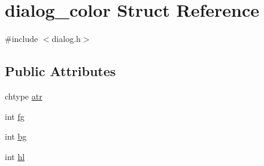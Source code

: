 \hypertarget{structdialog__color}{\section{dialog\-\_\-color Struct Reference}
\label{structdialog__color}
}


{\ttfamily \#include $<$dialog.\-h$>$}

\subsection*{Public Attributes}
\begin{DoxyCompactItemize}
\item 
chtype \hyperlink{structdialog__color_abfb3a5854ac137638cfea638fce34ab5}{atr}
\item 
int \hyperlink{structdialog__color_aba816605e659bab4a7c1cf4fe5538eaf}{fg}
\item 
int \hyperlink{structdialog__color_aa8f3267c3ae46156f548b7ab1543ace1}{bg}
\item 
int \hyperlink{structdialog__color_a293709c3e84d6274396dfaf2ff9416a0}{hl}
\end{DoxyCompactItemize}


